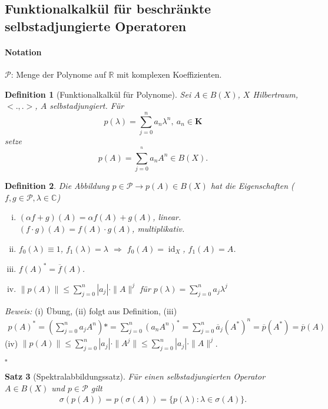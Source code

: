 \documentclass[12pt,a4paper,titlepage]{scrartcl}
\newtheorem{Satz}{Satz}[subsection]
\newtheorem{Definition}[Satz]{Definition}
\DeclareMathOperator{\id}{id}
\numberwithin{equation}{section}
\newcommand{\C}{\mathbb{C}} %
\newcommand{\R}{\mathbb{R}} %
\newcommand{\m}{\cdot}
\newcommand{\Bew}{\emph{Beweis: }}
\newcommand{\qed}{\begin{flushright}
		$\square$
	\end{flushright}}
\begin{document}
	\subsection{Funktionalkalkül für beschränkte selbstadjungierte Operatoren}
	
	\paragraph{Notation} $\mathcal{P}$: Menge der Polynome auf $\R$ mit komplexen Koeffizienten. 
	
	\begin{Definition}[Funktionalkalkül für Polynome]
		Sei $A\in B(X)$, $X$ Hilbertraum, $<.,.>$, $A$ selbstadjungiert. Für 
		$$p(\lambda) = \sum_{j = 0}^{n} a_n\lambda^n, ~ a_n\in \mathbf{K}$$
		setze 
		$$p(A) = \sum_{j = 0}^{^n}a_n A^n\in B(X).$$
	\end{Definition}
	
	\begin{Definition}
		Die Abbildung $p\in\mathcal{P}\rightarrow p(A) \in B(X)$ hat die Eigenschaften ($f,g\in \mathcal{P}, \lambda\in \C$)
		\begin{enumerate}[(i)]
			\item $(\alpha f +g)(A) = \alpha f(A)+g(A)$, linear. \\
			$(f\m g)(A) = f(A)\m g(A)$, multiplikativ.
			\item $f_0(\lambda)\equiv 1$, $f_1(\lambda) =\lambda$ $\Rightarrow$ $f_0(A) = \id_X$, $f_1(A) = A$.
			\item $f(A)^* =\overline{f}(A)$.
			\item $\boxed{\|p(A)\|\leq \sum_{j = 0}^{n}|a_j|\m\|A\|^j}$ für $p(\lambda) = \sum_{j = 0}^{n} a_j\lambda^j$
		\end{enumerate}
	\end{Definition}
	
	\Bew (i) Übung, (ii) folgt aus Definition, (iii) 
	\begin{align*}
		p(A)^* = (\sum_{j = 0}^{n}a_j A^n)* = \sum_{j = 0}^{n} (a_n A^n)^* = \sum_{j = 0}^{n} \overline{a}_j (A^*)^n = \overline{p}(A^*) = \overline{p}(A)
	\end{align*}
	(iv) $\|p(A)\| \leq\sum_{j = 0}^{n}|a_j|\m\|A^j\|\leq \sum_{j = 0}^{n}|a_j|\m\|A\|^j$.
	\qed
	
	\begin{Satz}[Spektralabbildungssatz]
		Für einen selbstadjungierten Operator $A\in B(X)$ und $p\in \mathcal{P}$ gilt 
		\begin{align*}
			\sigma(p(A)) = p(\sigma(A)) = \{p(\lambda):\lambda\in \sigma(A) \}.
		\end{align*}
	\end{Satz}
	
\end{document}
